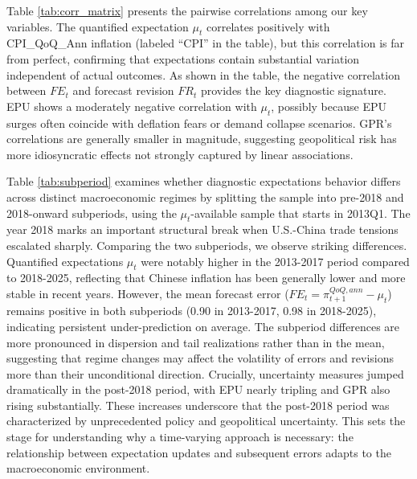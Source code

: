 \documentclass[12pt]{article}
\begin{document}






Table \ref{tab:corr_matrix} presents the pairwise correlations among our key variables. The quantified expectation $\mu_t$ correlates positively with CPI\_QoQ\_Ann inflation (labeled ``CPI'' in the table), but this correlation is far from perfect, confirming that expectations contain substantial variation independent of actual outcomes. As shown in the table, the negative correlation between $FE_t$ and forecast revision $FR_t$ provides the key diagnostic signature. EPU shows a moderately negative correlation with $\mu_t$, possibly because EPU surges often coincide with deflation fears or demand collapse scenarios. GPR's correlations are generally smaller in magnitude, suggesting geopolitical risk has more idiosyncratic effects not strongly captured by linear associations.



Table \ref{tab:subperiod} examines whether diagnostic expectations behavior differs across distinct macroeconomic regimes by splitting the sample into pre-2018 and 2018-onward subperiods, using the $\mu_t$-available sample that starts in 2013Q1. The year 2018 marks an important structural break when U.S.-China trade tensions escalated sharply. Comparing the two subperiods, we observe striking differences. Quantified expectations $\mu_t$ were notably higher in the 2013-2017 period compared to 2018-2025, reflecting that Chinese inflation has been generally lower and more stable in recent years. However, the mean forecast error ($FE_t=\pi^{QoQ,ann}_{t+1}-\mu_t$) remains positive in both subperiods (0.90 in 2013-2017, 0.98 in 2018-2025), indicating persistent under-prediction on average. The subperiod differences are more pronounced in dispersion and tail realizations rather than in the mean, suggesting that regime changes may affect the volatility of errors and revisions more than their unconditional direction. Crucially, uncertainty measures jumped dramatically in the post-2018 period, with EPU nearly tripling and GPR also rising substantially. These increases underscore that the post-2018 period was characterized by unprecedented policy and geopolitical uncertainty. This sets the stage for understanding why a time-varying approach is necessary: the relationship between expectation updates and subsequent errors adapts to the macroeconomic environment.
\end{document}
